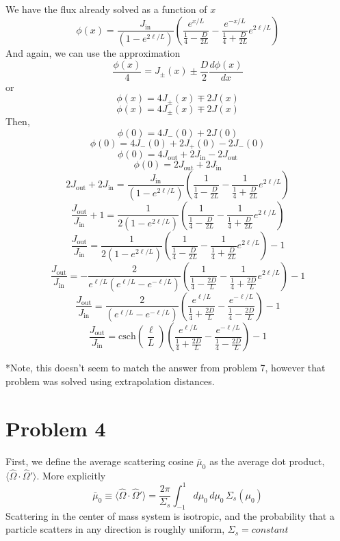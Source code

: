 \documentclass{article}
\newcommand{\Oh}{\hat{\Omega}}
\begin{document}
We have the flux already solved as a function of $x$
$$ \phi(x) = \frac{J_{\text{in}}}{\left(1 -e^{2\ell/L}\right)}\left(\frac{e^{x/L}}{\frac{1}{4} - \frac{D}{2L}} -\frac{e^{-x/L}}{\frac{1}{4} + \frac{D}{2L}}e^{2\ell/L}\right) $$
And again, we can use the approximation
$$ \frac{\phi(x)}{4} = J_{\pm}(x) \pm \frac{D}{2}\frac{d\phi(x)}{dx} $$
or
$$ \phi(x) = 4J_{\pm}(x) \mp 2J(x) $$
$$ \phi(x) = 4J_{\pm}(x) \mp 2J(x) $$
Then,
$$ \phi(0) = 4J_-(0) + 2J(0) $$
$$ \phi(0) = 4J_-(0) + 2J_+(0) - 2J_-(0) $$
$$ \phi(0) = 4J_{\text{out}} + 2J_{\text{in}} - 2J_{\text{out}} $$
$$ \phi(0) = 2J_{\text{out}} + 2J_{\text{in}} $$
$$ 2J_{\text{out}} + 2J_{\text{in}} = \frac{J_{\text{in}}}{\left(1 -e^{2\ell/L}\right)}\left(\frac{1}{\frac{1}{4} - \frac{D}{2L}} -\frac{1}{\frac{1}{4} + \frac{D}{2L}}e^{2\ell/L}\right)$$
$$ \frac{J_{\text{out}}}{J_{\text{in}}} + 1 = \frac{1}{2\left(1 -e^{2\ell/L}\right)}\left(\frac{1}{\frac{1}{4} - \frac{D}{2L}} -\frac{1}{\frac{1}{4} + \frac{D}{2L}}e^{2\ell/L}\right)$$
$$ \frac{J_{\text{out}}}{J_{\text{in}}} = \frac{1}{2\left(1 -e^{2\ell/L}\right)}\left(\frac{1}{\frac{1}{4} - \frac{D}{2L}} -\frac{1}{\frac{1}{4} + \frac{D}{2L}}e^{2\ell/L}\right) - 1$$
$$ \frac{J_{\text{out}}}{J_{\text{in}}} = -\frac{2}{e^{\ell/L}\left(e^{\ell/L} -e^{-\ell/L}\right)}\left(\frac{1}{\frac{1}{4} - \frac{2D}{L}} -\frac{1}{\frac{1}{4} + \frac{2D}{L}}e^{2\ell/L}\right) - 1$$
$$ \frac{J_{\text{out}}}{J_{\text{in}}} = \frac{2}{\left(e^{\ell/L} -e^{-\ell/L}\right)}\left(\frac{e^{\ell/L}}{\frac{1}{4} + \frac{2D}{L}} - \frac{e^{-\ell/L}}{\frac{1}{4} - \frac{2D}{L}} \right) - 1$$
$$ \frac{J_{\text{out}}}{J_{\text{in}}} = \text{csch}\left(\frac{\ell}{L}\right)\left(\frac{e^{\ell/L}}{\frac{1}{4} + \frac{2D}{L}} - \frac{e^{-\ell/L}}{\frac{1}{4} - \frac{2D}{L}} \right) - 1$$


*Note, this doesn't seem to match the answer from problem 7, however that problem was solved using extrapolation distances. 




\section*{Problem 4}

First, we define the average scattering cosine $\bar{\mu}_0$ as the average dot product, $\langle \Oh \cdot \Oh' \rangle$. More explicitly
$$ \bar{\mu}_0 \equiv \langle \Oh \cdot \Oh' \rangle = \frac{2\pi}{\Sigma_s}\int_{-1}^{1} d\mu_0 \, d\mu_0 \, \Sigma_s(\mu_0) $$
Scattering in the center of mass system is isotropic, and the probability that a particle scatters in any direction is roughly uniform, $\Sigma_s = constant$
\end{document}
